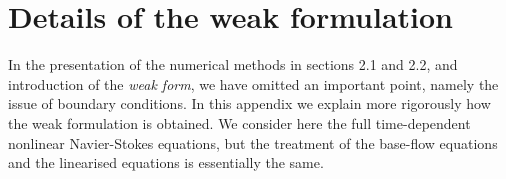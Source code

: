 \documentclass[twocolumn,10pt]{asme2ej}
\begin{document}


\appendix

\section{Details of the weak formulation}

In the presentation of the numerical methods in sections 2.1 and 2.2, and introduction of the {\em weak form}, we have omitted an important point, namely the issue of boundary conditions. In this appendix we explain more rigorously how the weak formulation is obtained. We consider here the full time-dependent nonlinear Navier-Stokes equations, but the treatment of the base-flow equations and the linearised equations is essentially the same.
\end{document}
